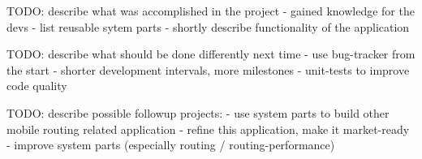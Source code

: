 TODO: describe what was accomplished in the project
- gained knowledge for the devs
- list reusable sytem parts
- shortly describe functionality of the application

TODO: describe what should be done differently next time
- use bug-tracker from the start
- shorter development intervals, more milestones
- unit-tests to improve code quality

TODO: describe possible followup projects:
- use system parts to build other mobile routing related application
- refine this application, make it market-ready
- improve system parts (especially routing / routing-performance)